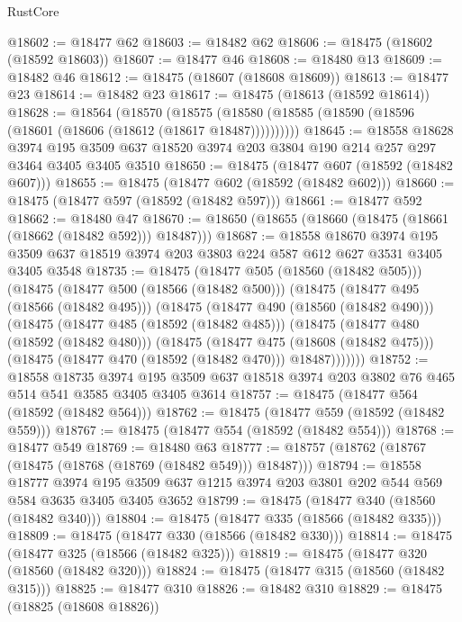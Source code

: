 \begin{lexlean}{RustCore}
\begin{coremodule}
@18602 := @18477 @62
@18603 := @18482 @62
@18606 := @18475 (@18602 (@18592 @18603))
@18607 := @18477 @46
@18608 := @18480 @13
@18609 := @18482 @46
@18612 := @18475 (@18607 (@18608 @18609))
@18613 := @18477 @23
@18614 := @18482 @23
@18617 := @18475 (@18613 (@18592 @18614))
@18628 := @18564
    (@18570 (@18575 (@18580 (@18585 (@18590 (@18596 (@18601 (@18606 (@18612 (@18617 @18487))))))))))
@18645 := @18558
    @18628
    @3974
    @195
    @3509
    @637
    @18520
    @3974
    @203
    @3804
    @190
    @214
    @257
    @297
    @3464
    @3405
    @3405
    @3510
@18650 := @18475 (@18477 @607 (@18592 (@18482 @607)))
@18655 := @18475 (@18477 @602 (@18592 (@18482 @602)))
@18660 := @18475 (@18477 @597 (@18592 (@18482 @597)))
@18661 := @18477 @592
@18662 := @18480 @47
@18670 := @18650 (@18655 (@18660 (@18475 (@18661 (@18662 (@18482 @592))) @18487)))
@18687 := @18558
    @18670
    @3974
    @195
    @3509
    @637
    @18519
    @3974
    @203
    @3803
    @224
    @587
    @612
    @627
    @3531
    @3405
    @3405
    @3548
@18735 := @18475
    (@18477 @505 (@18560 (@18482 @505)))
    (@18475
      (@18477 @500 (@18566 (@18482 @500)))
      (@18475
        (@18477 @495 (@18566 (@18482 @495)))
        (@18475
          (@18477 @490 (@18560 (@18482 @490)))
          (@18475
            (@18477 @485 (@18592 (@18482 @485)))
            (@18475
              (@18477 @480 (@18592 (@18482 @480)))
              (@18475
                (@18477 @475 (@18608 (@18482 @475)))
                (@18475 (@18477 @470 (@18592 (@18482 @470))) @18487)))))))
@18752 := @18558
    @18735
    @3974
    @195
    @3509
    @637
    @18518
    @3974
    @203
    @3802
    @76
    @465
    @514
    @541
    @3585
    @3405
    @3405
    @3614
@18757 := @18475 (@18477 @564 (@18592 (@18482 @564)))
@18762 := @18475 (@18477 @559 (@18592 (@18482 @559)))
@18767 := @18475 (@18477 @554 (@18592 (@18482 @554)))
@18768 := @18477 @549
@18769 := @18480 @63
@18777 := @18757 (@18762 (@18767 (@18475 (@18768 (@18769 (@18482 @549))) @18487)))
@18794 := @18558
    @18777
    @3974
    @195
    @3509
    @637
    @1215
    @3974
    @203
    @3801
    @202
    @544
    @569
    @584
    @3635
    @3405
    @3405
    @3652
@18799 := @18475 (@18477 @340 (@18560 (@18482 @340)))
@18804 := @18475 (@18477 @335 (@18566 (@18482 @335)))
@18809 := @18475 (@18477 @330 (@18566 (@18482 @330)))
@18814 := @18475 (@18477 @325 (@18566 (@18482 @325)))
@18819 := @18475 (@18477 @320 (@18560 (@18482 @320)))
@18824 := @18475 (@18477 @315 (@18560 (@18482 @315)))
@18825 := @18477 @310
@18826 := @18482 @310
@18829 := @18475 (@18825 (@18608 @18826))

\end{coremodule}
\end{lexlean}
